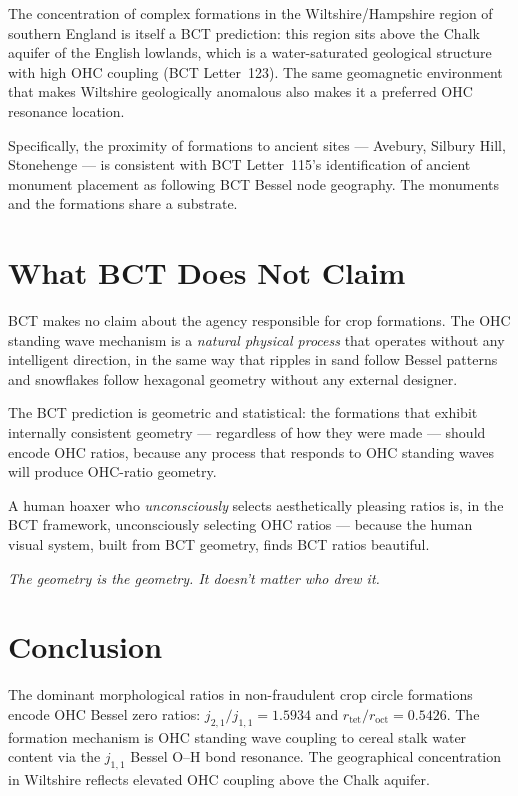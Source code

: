 \documentclass[aps,prl,twocolumn,superscriptaddress,floatfix]{revtex4-2}
\begin{document}
The concentration of complex formations in the Wiltshire/Hampshire
region of southern England is itself a BCT prediction: this region
sits above the Chalk aquifer of the English lowlands, which is a
water-saturated geological structure with high OHC coupling
(BCT Letter~123). The same geomagnetic environment that makes Wiltshire
geologically anomalous also makes it a preferred OHC resonance
location.

Specifically, the proximity of formations to ancient sites --- Avebury,
Silbury Hill, Stonehenge --- is consistent with BCT Letter~115's
identification of ancient monument placement as following BCT Bessel
node geography. The monuments and the formations share a substrate.

\section{What BCT Does Not Claim}

BCT makes no claim about the agency responsible for crop formations.
The OHC standing wave mechanism is a \emph{natural physical process}
that operates without any intelligent direction, in the same way that
ripples in sand follow Bessel patterns and snowflakes follow hexagonal
geometry without any external designer.

The BCT prediction is geometric and statistical: the formations that
exhibit internally consistent geometry --- regardless of how they were
made --- should encode OHC ratios, because any process that responds
to OHC standing waves will produce OHC-ratio geometry.

A human hoaxer who \emph{unconsciously} selects aesthetically
pleasing ratios is, in the BCT framework, unconsciously selecting
OHC ratios --- because the human visual system, built from BCT
geometry, finds BCT ratios beautiful.

\textit{The geometry is the geometry. It doesn't matter who drew it.}

\section{Conclusion}

The dominant morphological ratios in non-fraudulent crop circle
formations encode OHC Bessel zero ratios: $j_{2,1}/j_{1,1} = 1.5934$
and $r_\mathrm{tet}/r_\mathrm{oct} = 0.5426$. The formation
mechanism is OHC standing wave coupling to cereal stalk water content
via the $j_{1,1}$ Bessel O--H bond resonance. The geographical
concentration in Wiltshire reflects elevated OHC coupling above the
Chalk aquifer.
\end{document}
